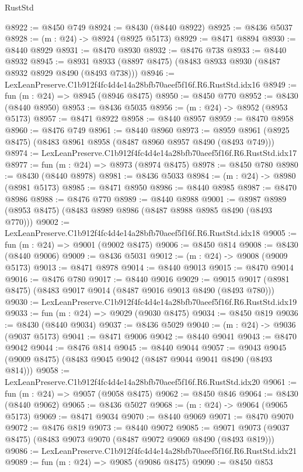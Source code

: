 \begin{lexlean}{RustStd}
\begin{coremodule}
@8922 := @8450 @749
@8924 := @8430 (@8440 @8922)
@8925 := @8436 @5037
@8928 := (m : @24) -> @8924 (@8925 @5173)
@8929 := @8471 @8894
@8930 := @8440 @8929
@8931 := @8470 @8930
@8932 := @8476 @738
@8933 := @8440 @8932
@8945 := @8931 @8933 (@8897 @8475) (@8483 @8933 @8930 (@8487 @8932 @8929 @8490 (@8493 @738)))
@8946 := LexLeanPreserve.C1b912f4fc4d4e14a28bfb70aeef5f16f.R6.RustStd.idx16
@8949 := fun (m : @24) => @8945 (@8946 @8475)
@8950 := @8450 @770
@8952 := @8430 (@8440 @8950)
@8953 := @8436 @5035
@8956 := (m : @24) -> @8952 (@8953 @5173)
@8957 := @8471 @8922
@8958 := @8440 @8957
@8959 := @8470 @8958
@8960 := @8476 @749
@8961 := @8440 @8960
@8973 := @8959 @8961 (@8925 @8475) (@8483 @8961 @8958 (@8487 @8960 @8957 @8490 (@8493 @749)))
@8974 := LexLeanPreserve.C1b912f4fc4d4e14a28bfb70aeef5f16f.R6.RustStd.idx17
@8977 := fun (m : @24) => @8973 (@8974 @8475)
@8978 := @8450 @780
@8980 := @8430 (@8440 @8978)
@8981 := @8436 @5033
@8984 := (m : @24) -> @8980 (@8981 @5173)
@8985 := @8471 @8950
@8986 := @8440 @8985
@8987 := @8470 @8986
@8988 := @8476 @770
@8989 := @8440 @8988
@9001 := @8987 @8989 (@8953 @8475) (@8483 @8989 @8986 (@8487 @8988 @8985 @8490 (@8493 @770)))
@9002 := LexLeanPreserve.C1b912f4fc4d4e14a28bfb70aeef5f16f.R6.RustStd.idx18
@9005 := fun (m : @24) => @9001 (@9002 @8475)
@9006 := @8450 @814
@9008 := @8430 (@8440 @9006)
@9009 := @8436 @5031
@9012 := (m : @24) -> @9008 (@9009 @5173)
@9013 := @8471 @8978
@9014 := @8440 @9013
@9015 := @8470 @9014
@9016 := @8476 @780
@9017 := @8440 @9016
@9029 := @9015 @9017 (@8981 @8475) (@8483 @9017 @9014 (@8487 @9016 @9013 @8490 (@8493 @780)))
@9030 := LexLeanPreserve.C1b912f4fc4d4e14a28bfb70aeef5f16f.R6.RustStd.idx19
@9033 := fun (m : @24) => @9029 (@9030 @8475)
@9034 := @8450 @819
@9036 := @8430 (@8440 @9034)
@9037 := @8436 @5029
@9040 := (m : @24) -> @9036 (@9037 @5173)
@9041 := @8471 @9006
@9042 := @8440 @9041
@9043 := @8470 @9042
@9044 := @8476 @814
@9045 := @8440 @9044
@9057 := @9043 @9045 (@9009 @8475) (@8483 @9045 @9042 (@8487 @9044 @9041 @8490 (@8493 @814)))
@9058 := LexLeanPreserve.C1b912f4fc4d4e14a28bfb70aeef5f16f.R6.RustStd.idx20
@9061 := fun (m : @24) => @9057 (@9058 @8475)
@9062 := @8450 @846
@9064 := @8430 (@8440 @9062)
@9065 := @8436 @5027
@9068 := (m : @24) -> @9064 (@9065 @5173)
@9069 := @8471 @9034
@9070 := @8440 @9069
@9071 := @8470 @9070
@9072 := @8476 @819
@9073 := @8440 @9072
@9085 := @9071 @9073 (@9037 @8475) (@8483 @9073 @9070 (@8487 @9072 @9069 @8490 (@8493 @819)))
@9086 := LexLeanPreserve.C1b912f4fc4d4e14a28bfb70aeef5f16f.R6.RustStd.idx21
@9089 := fun (m : @24) => @9085 (@9086 @8475)
@9090 := @8450 @853

\end{coremodule}
\end{lexlean}
